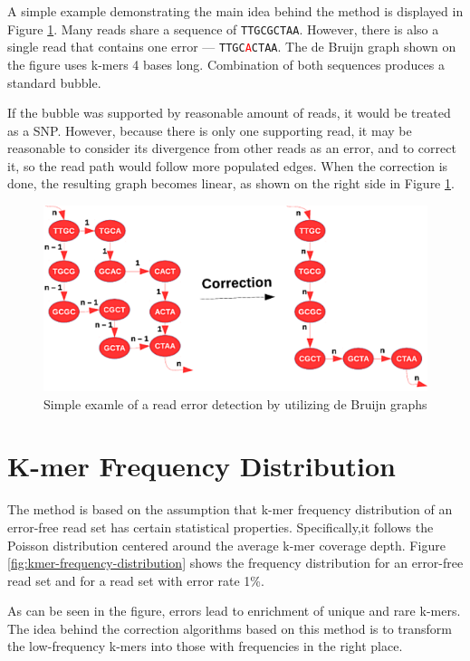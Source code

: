 A simple example demonstrating the main idea behind the method is displayed in Figure \ref{fig:error-correction-db}. Many reads share a sequence of \texttt{TTGCGCTAA}. However, there is also a single read that contains one error --- \texttt{TTGC{\textcolor{red}{A}}CTAA}. The de Bruijn graph shown on the figure uses k-mers 4 bases long. Combination of both sequences produces a standard bubble.

If the bubble was supported by reasonable amount of reads, it would be treated as a SNP. However, because there is only one supporting read, it may be reasonable to consider its divergence from other reads as an error, and to correct it, so the read path would follow more populated edges. When the correction is done, the resulting graph becomes linear, as shown on the right side in Figure \ref{fig:error-correction-db}.

\begin{figure}[h]
	\centering
	\includegraphics{img/error-correction-db.pdf}
	\caption{Simple examle of a read error detection by utilizing de Bruijn graphs}
	\label{fig:error-correction-db}
\end{figure}

\section{K-mer Frequency Distribution}
\label{sec:ec-kmer-frequency-distribution}

The method is based on the assumption that k-mer frequency distribution of an error-free read set has certain statistical properties. Specifically,it follows the Poisson distribution centered around the average k-mer coverage depth.  Figure \ref{fig:kmer-frequency-distribution} shows the frequency distribution for an error-free read set and for a read set with error rate 1\%. 

As can be seen in the figure, errors lead to enrichment of unique and rare
k-mers. The idea behind the correction algorithms based on this method is to transform the low-frequency k-mers into those with frequencies in the right place.

